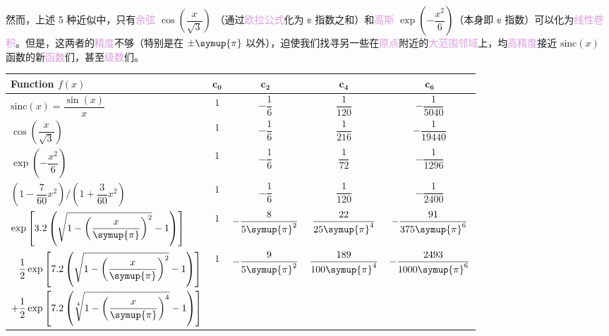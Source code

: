 然而，上述 5 种近似中，只有\textcolor{Plum}{余弦} $\cos \left( {\dfrac{x}{{\sqrt 3 }}} \right)$ （通过\textcolor{Plum}{欧拉公式}化为 $\mathbb{e}$ 指数之和）和\textcolor{Plum}{高斯} $\exp \left( { - \dfrac{x^2}{6}} \right)$（本身即 $\mathbb{e}$ 指数）可以化为\textcolor{Plum}{线性卷积}。但是，这两者的\textcolor{Plum}{精度}不够（特别是在 $\pm \symup{\pi}$ 以外），迫使我们找寻另一些在\textcolor{Plum}{原点}附近的\textcolor{Plum}{大范围}\textcolor{Plum}{邻域}上，均\textcolor{Plum}{高精度}接近 $\text{sinc} \left( x \right)$ 函数的新\textcolor{Plum}{函数}们，甚至\textcolor{Plum}{级数}们。
\begin{table}[htbp]
	\centering
	\renewcommand{\arraystretch}{2.2}
	\label{tab:coefficients}
	\begin{tabular}{lcccc}
		\toprule
		\textbf{Function} $f(x)$ & $\boldsymbol{c_0}$ & $\boldsymbol{c_2}$ & $\boldsymbol{c_4}$ & $\boldsymbol{c_6}$ \\
		\midrule
		$\text{sinc}(x) = \dfrac{\sin(x)}{x}$ 
		& $1$ & $-\dfrac{1}{6}$ & $\dfrac{1}{120}$ & $-\dfrac{1}{5040}$ \\
		
		$\cos\left(\dfrac{x}{\sqrt{3}}\right)$ 
		& $1$ & $-\dfrac{1}{6}$ & $\dfrac{1}{216}$ & $-\dfrac{1}{19440}$ \\
		
		$\exp\left(-\dfrac{x^2}{6}\right)$
		& $1$ & $-\dfrac{1}{6}$ & $\dfrac{1}{72}$ & $-\dfrac{1}{1296}$ \\
		
		$\left( 1-\dfrac{7}{60}x^2 \right) \big/ \left( 1+\dfrac{3}{60}x^2 \right)$
		& $1$ & $-\dfrac{1}{6}$ & $\dfrac{1}{120}$ & $-\dfrac{1}{2400}$ \\
		
		$\exp\left[3.2\left(\sqrt{1-\left( \dfrac{x}{\symup{\pi}} \right)^2}-1\right)\right]$
		& $1$ & $-\dfrac{8}{5\symup{\pi}^2}$ & $\dfrac{22}{25\symup{\pi}^4}$ & $-\dfrac{91}{375\symup{\pi}^6}$ \\
		
		$\begin{aligned}
			&\dfrac{1}{2}\exp\left[7.2\left(\sqrt{1-\left( \dfrac{x}{\symup{\pi}} \right)^2}-1\right)\right] \\ 
			+&\dfrac{1}{2}\exp\left[7.2\left(\sqrt[4]{1-\left( \dfrac{x}{\symup{\pi}} \right)^4}-1\right)\right]
		\end{aligned}$
		& $1$ & $-\dfrac{9}{5\symup{\pi}^2}$ & $\dfrac{189}{100\symup{\pi}^4}$ & $-\dfrac{2493}{1000\symup{\pi}^6}$ \\
		\bottomrule
	\end{tabular}
\end{table}

